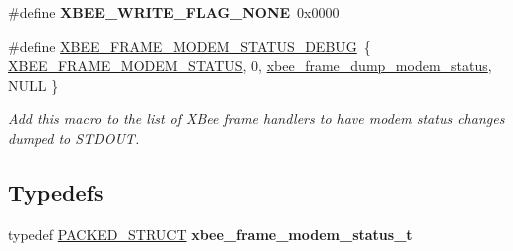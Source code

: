 \begin{DoxyCompactItemize}
\item 
\hypertarget{group__xbee__device_ga932b739da0b735b4d9ad229b4869cfc3}{\#define {\bfseries X\-B\-E\-E\-\_\-\-W\-R\-I\-T\-E\-\_\-\-F\-L\-A\-G\-\_\-\-N\-O\-N\-E}~0x0000}\label{group__xbee__device_ga932b739da0b735b4d9ad229b4869cfc3}

\item 
\hypertarget{group__xbee__device_gabeb9dfc3097d684df3fd9284021085f6}{\#define \hyperlink{group__xbee__device_gabeb9dfc3097d684df3fd9284021085f6}{X\-B\-E\-E\-\_\-\-F\-R\-A\-M\-E\-\_\-\-M\-O\-D\-E\-M\-\_\-\-S\-T\-A\-T\-U\-S\-\_\-\-D\-E\-B\-U\-G}~\{ \hyperlink{group__xbee__device_gga7753bbebaf00d6d64942f64b6ae9b7b9adff71d45371cf6b933688c43994b7f81}{X\-B\-E\-E\-\_\-\-F\-R\-A\-M\-E\-\_\-\-M\-O\-D\-E\-M\-\_\-\-S\-T\-A\-T\-U\-S}, 0, \hyperlink{group__xbee__device_gae54cdc832021172ae535a449856450b7}{xbee\-\_\-frame\-\_\-dump\-\_\-modem\-\_\-status}, N\-U\-L\-L \}}\label{group__xbee__device_gabeb9dfc3097d684df3fd9284021085f6}

\begin{DoxyCompactList}\small\item\em Add this macro to the list of X\-Bee frame handlers to have modem status changes dumped to S\-T\-D\-O\-U\-T. \end{DoxyCompactList}\end{DoxyCompactItemize}
\subsection*{Typedefs}
\begin{DoxyCompactItemize}
\item 
typedef \hyperlink{group___s_x_a_ga4233297bd31be5c273d4fb0758cc54d7}{P\-A\-C\-K\-E\-D\-\_\-\-S\-T\-R\-U\-C\-T} {\bfseries xbee\-\_\-frame\-\_\-modem\-\_\-status\-\_\-t}
\end{DoxyCompactItemize}
